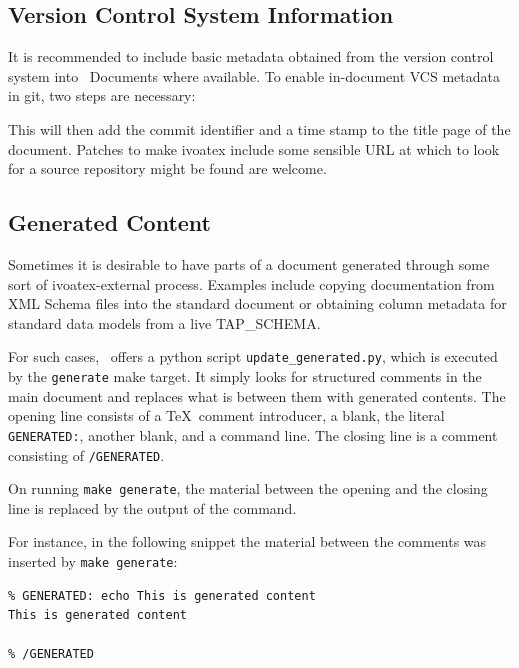 \documentclass[11pt,a4paper]{ivoa}
\begin{document}
\subsection{Version Control System Information}
\label{sect:vcs}

It is recommended to include basic metadata obtained from the version
control system into \ivoatex~Documents where available.
To enable in-document VCS metadata in git, two steps are necessary:


This will then add the commit identifier and a time stamp to the title
page of the document.  Patches to make ivoatex include some sensible URL
at which to look for a source repository might be found are welcome.


\subsection{Generated Content}
\label{sect:generated}

Sometimes it is desirable to have parts of a document generated through
some sort of ivoatex-external process.  Examples include copying
documentation from XML Schema files into the standard document
or obtaining column metadata for standard
data models from a live TAP\_SCHEMA.

For such cases, \ivoatex\ offers a python script
\texttt{update\_generated.py}, which is executed by the
\texttt{generate} make target.  It simply looks for structured comments
in the main document and replaces what is between them with generated
contents.  The opening line consists of a \TeX~comment introducer, a
blank, the literal \texttt{GENERATED:}, another blank, and a command
line.  The closing line is a comment consisting of \texttt{/GENERATED}.

On running \texttt{make generate}, the material between the opening and
the closing line is replaced by the output of the command.

For instance, in the following snippet the material between the comments
was inserted by \texttt{make generate}:

\begin{lstlisting}
% GENERATED: echo This is generated content
This is generated content

% /GENERATED
\end{lstlisting}
\end{document}
